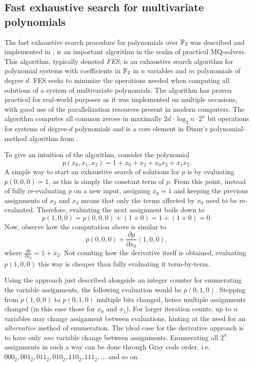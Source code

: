 \subsection{Fast exhaustive search for multivariate polynomials} \label{sec:prereq:fes}
The fast exhaustive search procedure for polynomials over $\mathbb{F}_2$ was described and implemented in \cite{ches-2010-23990, cryptoeprint:2013/436, tungchoumasters},
is an important algorithm in the realm of practical MQ-solvers. This algorithm, typically denoted \textit{FES}, is an exhaustive search algorithm for polynomial systems with coefficients in $\mathbb{F}_2$ in $n$ variables and $m$ polynomials of degree $d$. FES seeks to minimize the operations needed when computing all solutions of a system of multivariate polynomials. The algorithm has proven practical for real-world purposes as it was implemented on multiple occasions, with good use of the parallelization resources present in modern computers. The algorithm computes all common zeroes in maximally $2d\cdot \log_2n \cdot 2^n$ bit operations
for systems of degree-$d$ polynomials and is a core element in Dinur's polynomial-method algorithm from \cite{eurocrypt-2021-30841}.

To give an intuition of the algorithm, consider the polynomial
$$
    p(x_0, x_1, x_2) = 1 + x_0 + x_2 + x_0x_2 + x_1x_2.
$$
A simple way to start an exhaustive search of solutions for $p$ is by evaluating $p(0, 0, 0) = 1$, as this is simply the constant term of $p$. From this point, instead of fully re-evaluating $p$ on a new input, assigning $x_0 = 1$ and keeping the previous assignments of $x_2$ and $x_3$ means that only the terms affected by $x_0$ need to be re-evaluated. Therefore, evaluating the next assignment boils down to 
$$
    p(1, 0, 0) = p(0, 0, 0) + (1 + 0) = 1 + (1 + 0) = 0.
$$
Now, observe how the computation above is similar to 
$$
    p(0, 0, 0) + \frac{\partial p}{\partial x_0}(1, 0, 0),
$$
where $\frac{\partial p}{\partial x_0} = 1 + x_2$. Not counting how the derivative itself is obtained, evaluating $p(1, 0, 0)$ this way is cheaper than fully evaluating it term-by-term.

Using the approach just described alongside an integer counter for enumerating the variable assignments, the following evaluation would be $p(0,1,0)$. Stepping from $p(1,0,0)$ to $p(0,1,0)$ multiple bits changed, hence multiple assignments changed (in this case those for $x_0$ and $x_1$). For larger iteration counts, up to $n$ variables may change assignment between evaluations, hinting at the need for an \textit{alternative} method of enumeration. The ideal case for the derivative approach is to have only \textit{one} variable change between assignments. Enumerating all $2^n$ assignments in such a way can be done through Gray code order, i.e. $000_2, 001_2, 011_2, 010_2, 110_2, 111_2, \dots$ and so on.

